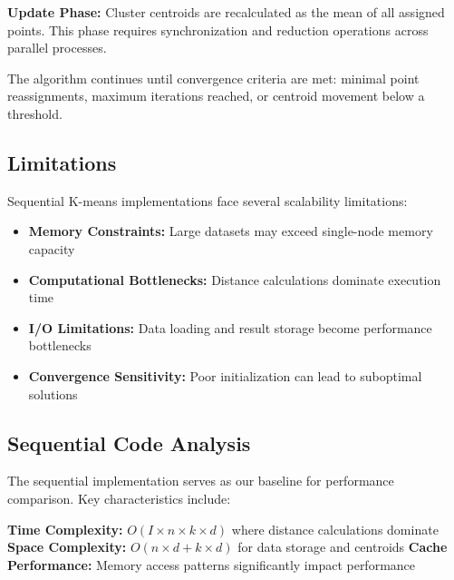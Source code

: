 \documentclass[10pt,a4paper,twocolumn]{article}
\begin{document}
\textbf{Update Phase:} Cluster centroids are recalculated as the mean of all assigned points. This phase requires synchronization and reduction operations across parallel processes.

The algorithm continues until convergence criteria are met: minimal point reassignments, maximum iterations reached, or centroid movement below a threshold.

\subsection{Limitations}

Sequential K-means implementations face several scalability limitations:

\begin{itemize}
\item \textbf{Memory Constraints:} Large datasets may exceed single-node memory capacity
\item \textbf{Computational Bottlenecks:} Distance calculations dominate execution time
\item \textbf{I/O Limitations:} Data loading and result storage become performance bottlenecks
\item \textbf{Convergence Sensitivity:} Poor initialization can lead to suboptimal solutions
\end{itemize}

\subsection{Sequential Code Analysis}

The sequential implementation serves as our baseline for performance comparison. Key characteristics include:

\textbf{Time Complexity:} $O(I \times n \times k \times d)$ where distance calculations dominate
\textbf{Space Complexity:} $O(n \times d + k \times d)$ for data storage and centroids
\textbf{Cache Performance:} Memory access patterns significantly impact performance
\end{document}
